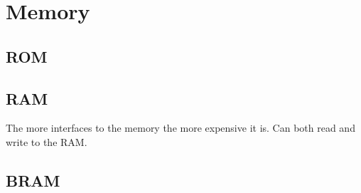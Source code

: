 \section{Memory}


\subsection{ROM}



\subsection{RAM}

The more interfaces to the memory the more expensive it is.
Can both read and write to the RAM.
\subsection{BRAM}
